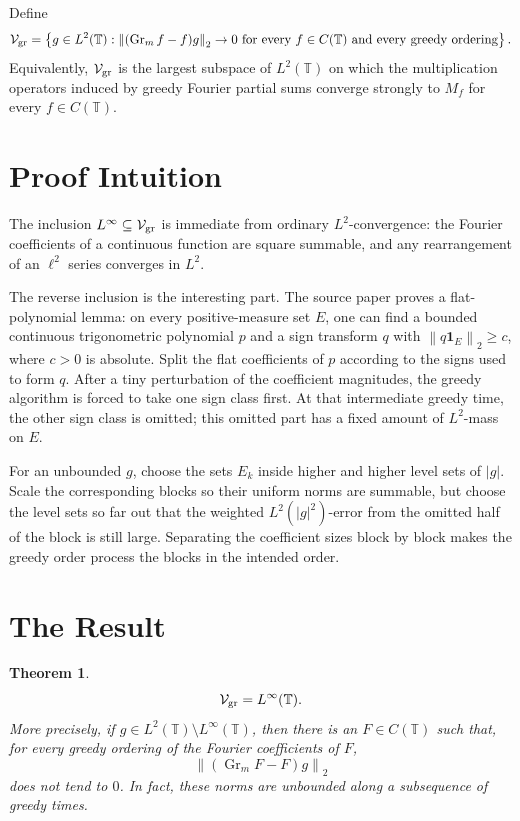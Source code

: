 \documentclass[11pt]{article}
\newtheorem{theorem}{Theorem}
\newcommand{\T}{\mathbb T}
\newcommand{\norm}[1]{\left\lVert #1 \right\rVert}
\newcommand{\abs}[1]{\left\lvert #1 \right\rvert}
\newcommand{\one}{\mathbf 1}
\newcommand{\Gr}{\operatorname{Gr}}
\begin{document}
Define
\[
  \mathcal V_{\rm gr}
  =
  \left\{g\in L^2(\T):
  \norm{(\Gr_m f-f)g}_2\to 0
  \text{ for every } f\in C(\T) \text{ and every greedy ordering}\right\}.
\]
Equivalently, \(\mathcal V_{\rm gr}\) is the largest subspace of \(L^2(\T)\) on which the multiplication operators induced by greedy Fourier partial sums converge strongly to \(M_f\) for every \(f\in C(\T)\).

\section*{Proof Intuition}

The inclusion \(L^\infty\subseteq \mathcal V_{\rm gr}\) is immediate from ordinary \(L^2\)-convergence: the Fourier coefficients of a continuous function are square summable, and any rearrangement of an \(\ell^2\) series converges in \(L^2\).

The reverse inclusion is the interesting part. The source paper proves a flat-polynomial lemma: on every positive-measure set \(E\), one can find a bounded continuous trigonometric polynomial \(p\) and a sign transform \(q\) with \(\norm{q\one_E}_2\ge c\), where \(c>0\) is absolute. Split the flat coefficients of \(p\) according to the signs used to form \(q\). After a tiny perturbation of the coefficient magnitudes, the greedy algorithm is forced to take one sign class first. At that intermediate greedy time, the other sign class is omitted; this omitted part has a fixed amount of \(L^2\)-mass on \(E\).

For an unbounded \(g\), choose the sets \(E_k\) inside higher and higher level sets of \(\abs g\). Scale the corresponding blocks so their uniform norms are summable, but choose the level sets so far out that the weighted \(L^2(|g|^2)\)-error from the omitted half of the block is still large. Separating the coefficient sizes block by block makes the greedy order process the blocks in the intended order.

\section*{The Result}

\begin{theorem}
\[
  \mathcal V_{\rm gr}=L^\infty(\T).
\]
More precisely, if \(g\in L^2(\T)\setminus L^\infty(\T)\), then there is an \(F\in C(\T)\) such that, for every greedy ordering of the Fourier coefficients of \(F\),
\[
  \norm{(\Gr_m F-F)g}_2
\]
does not tend to \(0\). In fact, these norms are unbounded along a subsequence of greedy times.
\end{theorem}
\end{document}

